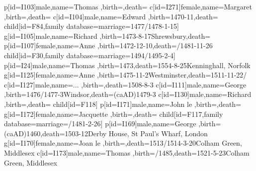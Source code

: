 {{{{{{						p[id=I103]{male,name={Thomas },birth={}{},death={}{}}
						c[id=I271]{female,name={Margaret },birth={}{},death={}{}}
					}
				}
				c[id=I104]{male,name={Edward },birth={1470-11}{},death={}{}}
				child[id=F84,family database={marriage={1477/1478-1-15}{}}]{
					g[id=I105]{male,name={Richard },birth={1473-8-17}{Shrewsbury},death={}{}}
					p[id=I107]{female,name={Anne },birth={1472-12-10}{},death={/1481-11-26}{}}
				}
				child[id=F30,family database={marriage={1494/1495-2-4}{}}]{
					p[id=I24]{male,name={Thomas },birth={1473}{},death={1554-8-25}{Kenninghall, Norfolk}}
					g[id=I125]{female,name={Anne },birth={1475-11-2}{Westminster},death={1511-11-22/}{}}
					c[id=I127]{male,name={... },birth={}{},death={1508-8-3}{}}
				}
				c[id=I111]{male,name={George },birth={1476/1477-3}{Windsor},death={(caAD)1479-3}{}}
			}
		}
		c[id=I130]{male,name={Richard },birth={}{},death={}{}}
		child[id=F118]{
			p[id=I171]{male,name={John le },birth={}{},death={}{}}
			g[id=I172]{female,name={Jacquette },birth={}{},death={}{}}
			child[id=F117,family database={marriage={/1481-2-26}{}}]{
				p[id=I169]{male,name={George },birth={(caAD)1460}{},death={1503-12}{Derby House, St Paul's Wharf, London}}
				g[id=I170]{female,name={Joan le },birth={}{},death={1513/1514-3-20}{Colham Green, Middlesex}}
				c[id=I173]{male,name={Thomas },birth={/1485}{},death={1521-5-23}{Colham Green, Middlesex}}
			}
		}
	}
}
